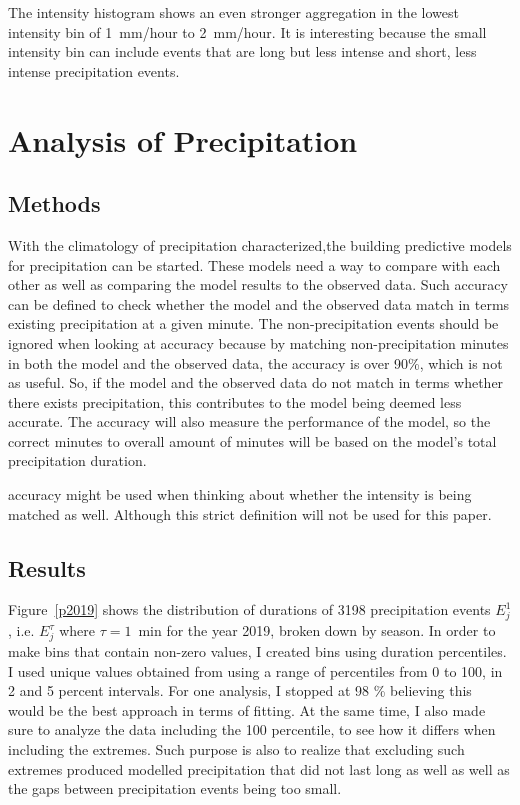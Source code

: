 \documentclass[11pt]{report}
\begin{document}
The intensity histogram shows an even stronger aggregation in the lowest
intensity bin of 1~mm/hour to 2~mm/hour. It is interesting because the small
intensity bin can include events that are long but less intense and short,
less intense precipitation events.

\section{Analysis of Precipitation}\label{sec:apc}


\subsection{Methods}\label{sec:methods}

With the climatology of precipitation characterized,the building predictive models for precipitation can be started. These models need a way to compare with each other as well as comparing the model results to the observed data. Such accuracy can be defined to check whether the model and the observed data match in terms existing precipitation at a given minute. The non-precipitation events should be ignored when looking at accuracy because by matching non-precipitation minutes in both the model and the observed data, the accuracy is over 90\%, which is not as useful. So, if the model and the
observed data do not match in terms whether there exists precipitation, this
contributes to the model being deemed less accurate. The accuracy will also measure the performance of the model, so the correct minutes to overall amount of minutes will be based on the model's total precipitation duration. 

accuracy might be used when thinking about whether the intensity is being matched as well. Although this strict definition will not be used for this paper. 

\subsection{Results}\label{sec:apcr}

Figure~\ref{p2019} shows the distribution of durations of 3198 precipitation
events $E_j^1$, i.e. $E_j^\tau$ where $\tau=1$~min for the year 2019, broken
down by season. In order to make bins that contain non-zero values, I
created bins using duration percentiles. I used unique values obtained from
using a range of percentiles from 0 to 100, in 2 and 5 percent
intervals. For one analysis, I stopped at 98 \% believing this would be the
best approach in terms of fitting. At the same time, I also made sure to
analyze the data including the 100 percentile, to see how it differs when
including the extremes. Such purpose is also to realize that excluding such
extremes produced modelled precipitation that did not last long as well as
well as the gaps between precipitation events being too small.
\end{document}
